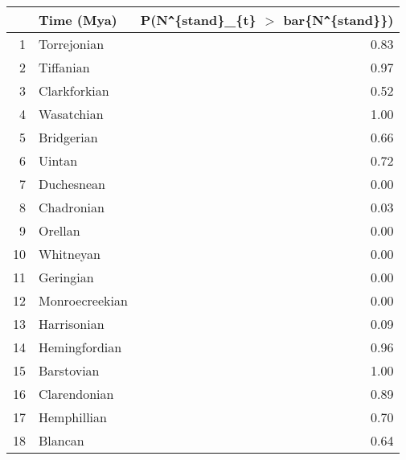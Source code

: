 \begin{table}[ht]
\centering
\begin{tabular}{rlr}
  \hline
 & Time (Mya) & P(N\verb|^|\{stand\}\_\{t\} $>$ bar\{N\verb|^|\{stand\}\}) \\ 
  \hline
1 & Torrejonian & 0.83 \\ 
  2 & Tiffanian & 0.97 \\ 
  3 & Clarkforkian & 0.52 \\ 
  4 & Wasatchian & 1.00 \\ 
  5 & Bridgerian & 0.66 \\ 
  6 & Uintan & 0.72 \\ 
  7 & Duchesnean & 0.00 \\ 
  8 & Chadronian & 0.03 \\ 
  9 & Orellan & 0.00 \\ 
  10 & Whitneyan & 0.00 \\ 
  11 & Geringian & 0.00 \\ 
  12 & Monroecreekian & 0.00 \\ 
  13 & Harrisonian & 0.09 \\ 
  14 & Hemingfordian & 0.96 \\ 
  15 & Barstovian & 1.00 \\ 
  16 & Clarendonian & 0.89 \\ 
  17 & Hemphillian & 0.70 \\ 
  18 & Blancan & 0.64 \\ 
   \hline
\end{tabular}
\label{tab:div_peak}
\end{table}
